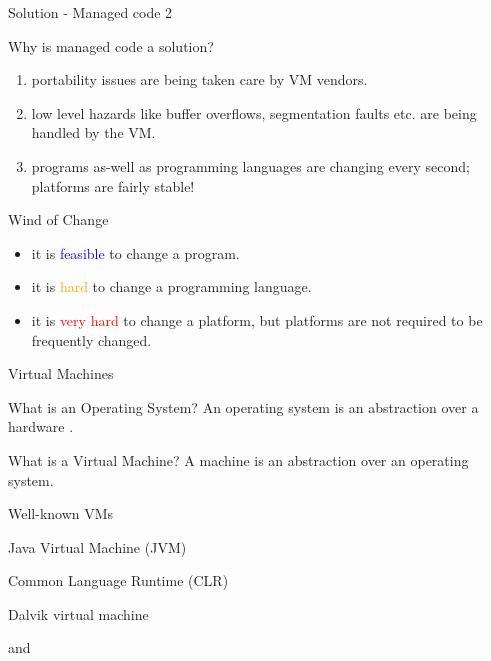 
\begin{frame}{Solution - Managed code 2}
\begin{block}{Why is managed code a solution?}
\begin{enumerate}
  \pause
  \item portability issues are being taken care by VM vendors.
  \pause
  \item low level hazards like buffer overflows, segmentation faults etc. are
  being handled by the VM.
  \pause
  \item programs as-well as programming languages are changing every second;
  platforms are fairly stable!
\end{enumerate}
\end{block}
\pause
\begin{block}{Wind of Change}
\begin{itemize}
  \item it is \textcolor{blue}{feasible} to change a program.
  \item it is \textcolor{orange}{hard} to change a programming language.
  \item it is \textcolor{red}{very hard} to change a platform, but platforms are
  not required to be frequently changed.
\end{itemize}
\end{block}
\end{frame}

\begin{frame}{Virtual Machines}
\begin{block}{What is an Operating System?}
An operating system is an abstraction over a hardware .
\end{block}
\pause
\begin{block}{What is a Virtual Machine?}
A  machine is an abstraction over an operating system.
\end{block}
\pause
\begin{exampleblock}{Well-known VMs}
\begin{description}
  \item[Java] Java Virtual Machine (JVM)
  \item[.Net] Common Language Runtime (CLR)
  \item[Android] Dalvik virtual machine
  \item
  and
\end{description}
\end{exampleblock}
\end{frame}

